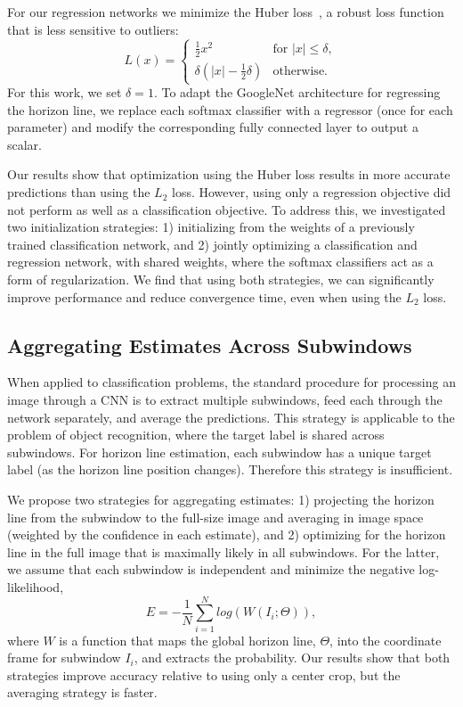 \documentclass{bmvc2k}
\begin{document}
For our regression networks we minimize the Huber
loss~\cite{huber1964robust}, a robust loss function that is less
sensitive to outliers:
\begin{equation}
  L(x) = \begin{cases} 
    \frac{1}{2}x^2 & \text{for } |x| \leq \delta, \\
    \delta(|x| - \frac{1}{2}\delta) & \text{otherwise}.
  \end{cases}
\end{equation}
For this work, we set $\delta = 1$. To adapt the GoogleNet
architecture for regressing the horizon line, we replace each softmax
classifier with a regressor (once for each parameter) and modify the
corresponding fully connected layer to output a scalar.

Our results show that optimization using the Huber loss results in
more accurate predictions than using the $L_2$ loss. However, using
only a regression objective did not perform as well as a
classification objective. To address this, we investigated two initialization
strategies: 1) initializing from the weights of a previously trained
classification network, and 2) jointly optimizing a classification and
regression network, with shared weights, where the softmax classifiers
act as a form of regularization. We find that using both strategies,
we can significantly improve performance and reduce convergence time,
even when using the $L_2$ loss.

\subsection{Aggregating Estimates Across Subwindows}
\label{sec:merging}

When applied to classification problems, the standard procedure for
processing an image through a CNN is to extract multiple subwindows,
feed each through the network separately, and average the predictions.
This strategy is applicable to the problem of object recognition,
where the target label is shared across subwindows. For horizon line
estimation, each subwindow has a unique target label (as the
horizon line position changes). Therefore this strategy is
insufficient. 

We propose two strategies for aggregating estimates: 1) projecting the
horizon line from the subwindow to the full-size image and averaging
in image space (weighted by the confidence in each estimate), and 2)
optimizing for the horizon line in the full image that is maximally
likely in all subwindows. For the latter, we assume that each
subwindow is independent and minimize the negative log-likelihood, 
\begin{equation}
  E = -\frac{1}{N}\sum_{i=1}^{N}log(W(I_i;\Theta)), 
\end{equation}
where $W$ is a function that maps the global horizon line, $\Theta$,
into the coordinate frame for subwindow $I_i$, and extracts the
probability.  Our results show that both strategies improve accuracy
relative to using only a center crop, but the averaging strategy is
faster. 
\end{document}
